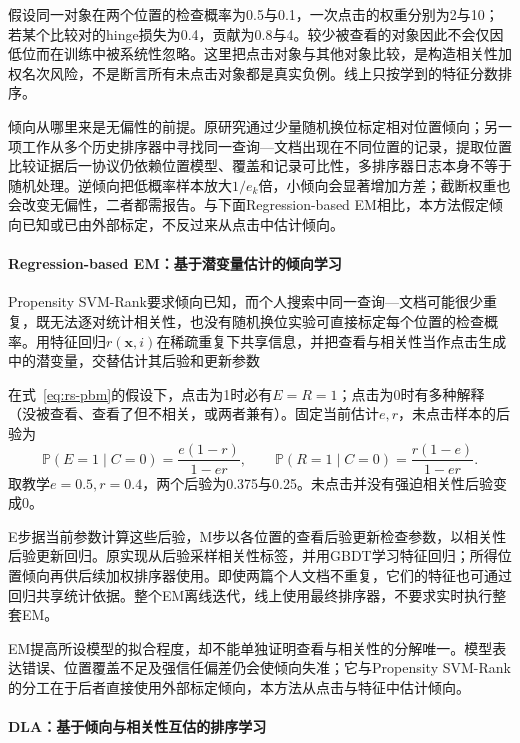 假设同一对象在两个位置的检查概率为0.5与0.1，一次点击的权重分别为2与10；若某个比较对的hinge损失为0.4，贡献为0.8与4。较少被查看的对象因此不会仅因低位而在训练中被系统性忽略。这里把点击对象与其他对象比较，是构造相关性加权名次风险，不是断言所有未点击对象都是真实负例。线上只按学到的特征分数排序。

倾向从哪里来是无偏性的前提。原研究通过少量随机换位标定相对位置倾向；另一项工作从多个历史排序器中寻找同一查询—文档出现在不同位置的记录，提取位置比较证据后一协议仍依赖位置模型、覆盖和记录可比性，多排序器日志本身不等于随机处理。逆倾向把低概率样本放大$1/e_k$倍，小倾向会显著增加方差；截断权重也会改变无偏性，二者都需报告。与下面Regression-based EM相比，本方法假定倾向已知或已由外部标定，不反过来从点击中估计倾向。

\paragraph{Regression-based EM：基于潜变量估计的倾向学习}
\label{sec:rs-regression-em}

Propensity SVM-Rank要求倾向已知，而个人搜索中同一查询—文档可能很少重复，既无法逐对统计相关性，也没有随机换位实验可直接标定每个位置的检查概率。用特征回归$r(\bm x,i)$在稀疏重复下共享信息，并把查看与相关性当作点击生成中的潜变量，交替估计其后验和更新参数

在式~\eqref{eq:rs-pbm}的假设下，点击为1时必有$E=R=1$；点击为0时有多种解释（没被查看、查看了但不相关，或两者兼有）。固定当前估计$e,r$，未点击样本的后验为
\begin{equation}
 \mathbb P(E=1\mid C=0)=\frac{e(1-r)}{1-er},\qquad
 \mathbb P(R=1\mid C=0)=\frac{r(1-e)}{1-er}.
 \label{eq:rs-rem-posterior}
\end{equation}
取教学$e=0.5,r=0.4$，两个后验为0.375与0.25。未点击并没有强迫相关性后验变成0。

E步据当前参数计算这些后验，M步以各位置的查看后验更新检查参数，以相关性后验更新回归。原实现从后验采样相关性标签，并用GBDT学习特征回归；所得位置倾向再供后续加权排序器使用。即使两篇个人文档不重复，它们的特征也可通过回归共享统计依据。整个EM离线迭代，线上使用最终排序器，不要求实时执行整套EM。

EM提高所设模型的拟合程度，却不能单独证明查看与相关性的分解唯一。模型表达错误、位置覆盖不足及强信任偏差仍会使倾向失准；它与Propensity SVM-Rank的分工在于后者直接使用外部标定倾向，本方法从点击与特征中估计倾向。

\paragraph{DLA：基于倾向与相关性互估的排序学习}
\label{sec:rs-dla}

